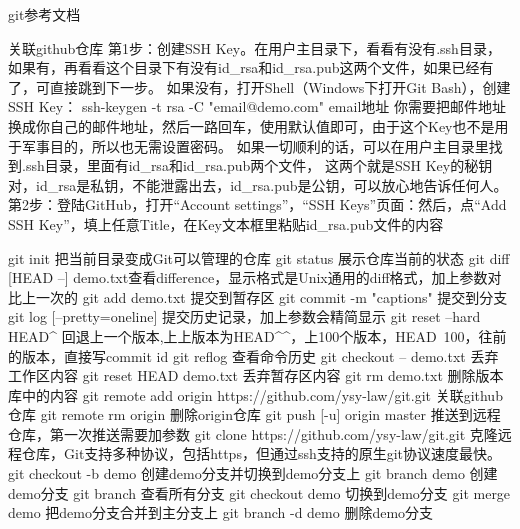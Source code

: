git参考文档

关联github仓库
第1步：创建SSH Key。在用户主目录下，看看有没有.ssh目录，
       如果有，再看看这个目录下有没有id_rsa和id_rsa.pub这两个文件，如果已经有了，可直接跳到下一步。
       如果没有，打开Shell（Windows下打开Git Bash），创建SSH Key：
       ssh-keygen -t rsa -C "email@demo.com" email地址	 
       你需要把邮件地址换成你自己的邮件地址，然后一路回车，使用默认值即可，由于这个Key也不是用于军事目的，所以也无需设置密码。
       如果一切顺利的话，可以在用户主目录里找到.ssh目录，里面有id_rsa和id_rsa.pub两个文件，
	   这两个就是SSH Key的秘钥对，id_rsa是私钥，不能泄露出去，id_rsa.pub是公钥，可以放心地告诉任何人。	
第2步：登陆GitHub，打开“Account settings”，“SSH Keys”页面：然后，点“Add SSH Key”，填上任意Title，在Key文本框里粘贴id_rsa.pub文件的内容	   

git init                   把当前目录变成Git可以管理的仓库
git status                 展示仓库当前的状态
git diff [HEAD --] demo.txt查看difference，显示格式是Unix通用的diff格式，加上参数对比上一次的
git add  demo.txt          提交到暂存区
git commit -m "captions"   提交到分支
git log [--pretty=oneline] 提交历史记录，加上参数会精简显示
git reset --hard HEAD^     回退上一个版本,上上版本为HEAD^^，上100个版本，HEAD~100，往前的版本，直接写commit id
git reflog                 查看命令历史
git checkout -- demo.txt   丢弃工作区内容
git reset HEAD demo.txt    丢弃暂存区内容 
git rm demo.txt            删除版本库中的内容
git remote add origin https://github.com/ysy-law/git.git  关联github仓库
git remote rm origin                                      删除origin仓库
git push [-u] origin master                               推送到远程仓库，第一次推送需要加参数
git clone https://github.com/ysy-law/git.git              克隆远程仓库，Git支持多种协议，包括https，但通过ssh支持的原生git协议速度最快。
git checkout -b demo       创建demo分支并切换到demo分支上
git branch demo            创建demo分支
git branch                 查看所有分支
git checkout demo          切换到demo分支
git merge demo             把demo分支合并到主分支上
git branch -d demo         删除demo分支